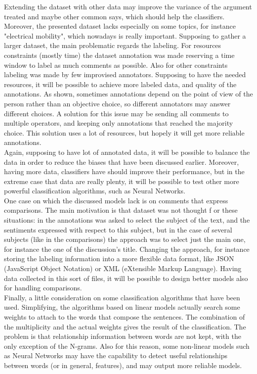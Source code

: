 Extending the dataset with other data may improve the variance of the argument treated and maybe other common says, which should help the classifiers. Moreover, the presented dataset lacks especially on some topics, for instance "electrical mobility", which nowadays is really important. Supposing to gather a larger dataset, the main problematic regards the labeling. For resources constraints (mostly time) the dataset annotation was made reserving a time window to label as much comments as possible. Also for other constraints labeling was made by few improvised annotators. Supposing to have the needed resources, it will be possible to achieve more labeled data, and quality of the annotations. As shown, sometimes annotations depend on the point of view of the person rather than an objective choice, so different annotators may answer different choices. A solution for this issue may be sending all comments to multiple operators, and keeping only annotations that reached the majority choice. This solution uses a lot of resources, but hopely it will get more reliable annotations.\\
Again, supposing to have lot of annotated data, it will be possible to balance the data in order to reduce the biases that have been discussed earlier. Moreover, having more data, classifiers have should improve their performance, but in the extreme case that data are really plenty, it will be possible to test other more powerful classification algorithms, such as Neural Networks.\\
One case on which the discussed models lack is on comments that express comparisons. The main motivation is that dataset was not thought f	or these situations: in the annotations was asked to select the subject of the text, and the sentiments expressed with respect to this subject, but in the case of several subjects (like in the comparisons) the approach was to select just the main one, for instance the one of the discussion's title. Changing the approach, for instance storing the labeling information into a more flexible data format, like JSON (JavaScript Object Notation) or XML (eXtensible Markup Language). Having data collected in this sort of files, it will be possible to design better models also for handling comparisons.\\
Finally, a little consideration on some classification algorithms that have been used. Simplifying, the algorithms based on linear models actually search some weights to attach to the words that compose the sentences. The combination of the multiplicity and the actual weights gives the result of the classification. The problem is that relationship information between words are not kept, with the only exception of the N-grams. Also for this reason, some non-linear models such as Neural Networks may have the capability to detect useful relationships between words (or in general, features), and may output more reliable models.


